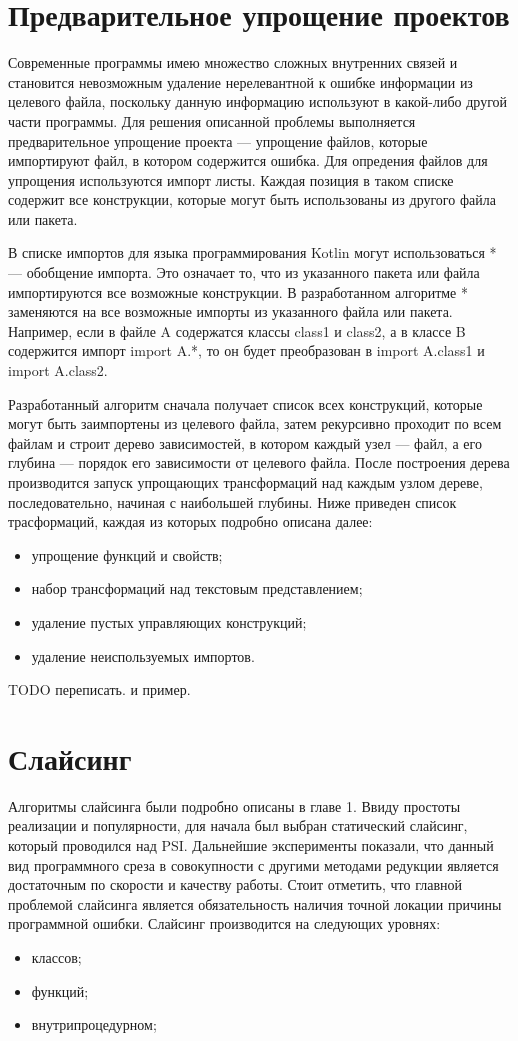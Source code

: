 \section{Предварительное упрощение проектов}
Современные программы имею множество сложных внутренних связей и становится невозможным удаление нерелевантной к ошибке информации из целевого файла, поскольку данную информацию используют в какой-либо другой части программы. Для решения описанной проблемы выполняется предварительное упрощение проекта --- упрощение файлов, которые импортируют файл, в котором содержится ошибка. Для опредения файлов для упрощения используются импорт листы. Каждая позиция в таком списке содержит все конструкции, которые могут быть использованы из другого файла или пакета. 

В списке импортов для языка программирования Kotlin могут использоваться * --- обобщение импорта. Это означает то, что из указанного пакета или файла импортируются все возможные конструкции. В разработанном алгоритме * заменяются на все возможные импорты из указанного файла или пакета. Например, если в файле A содержатся классы class1 и class2, а в классе B содержится импорт import A.*, то он будет преобразован в import A.class1 и import A.class2. 


Разработанный алгоритм сначала получает список всех конструкций, которые могут быть заимпортены из целевого файла, затем рекурсивно проходит по всем файлам и строит дерево зависимостей, в котором каждый узел --- файл, а его глубина --- порядок его зависимости от целевого файла. После построения дерева производится запуск упрощающих трансформаций над каждым узлом дереве, последовательно, начиная с наибольшей глубины. Ниже приведен список трасформаций, каждая из которых подробно описана далее:
\begin{itemize}
	\item упрощение функций и свойств;
	\item набор трансформаций над текстовым представлением;
	\item удаление пустых управляющих конструкций;
	\item удаление неиспользуемых импортов.
\end{itemize}



TODO переписать. и пример.
\section{Слайсинг}
Алгоритмы слайсинга были подробно описаны в главе 1. Ввиду простоты реализации и популярности, для начала был выбран статический слайсинг, который проводился над PSI. Дальнейшие эксперименты показали, что данный вид программного среза в совокупности с другими методами редукции является достаточным по скорости и качеству работы. Стоит отметить, что главной проблемой слайсинга является обязательность наличия точной локации причины программной ошибки.
Слайсинг производится на следующих уровнях:
\begin{itemize}
	\item классов;
	\item функций;
	\item внутрипроцедурном;
\end{itemize}
